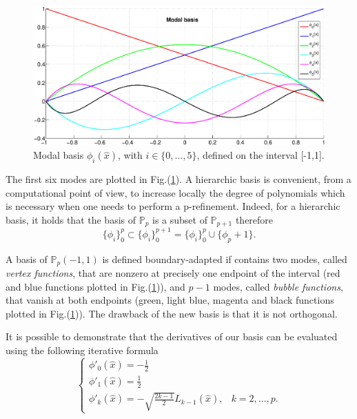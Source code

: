 \begin{figure}
\centering
\includegraphics[scale=0.3]{images/1D_basis.eps}
\caption{Modal basis $\phi_i(\hat{x})$, with $i\in\{0,\dots,5\}$, defined on the interval [-1,1].}\label{fig:1D_basis}
\end{figure}

The first six modes are plotted in Fig.(\ref{fig:1D_basis}). A hierarchic basis is convenient, from a computational point of view, to increase locally the degree of polynomials which is necessary when one needs to perform a p-refinement. Indeed, for a hierarchic basis, it holds that the basis of $\mathbb{P}_p$ is a subset of $\mathbb{P}_{p+1}$ therefore
\begin{equation}
  \{\phi_i\}_0^p\subset\{\phi_i\}_0^{p+1}=\{\phi_i\}_0^p\cup\{\phi_p+1\}.
\end{equation}

A basis of $\mathbb{P}_p(-1,1)$ is defined boundary-adapted if contains two modes, called \textit{vertex functions}, that are nonzero at precisely one endpoint of the interval (red and blue functions plotted in Fig.(\ref{fig:1D_basis})), and $p-1$ modes, called \textit{bubble functions}, that vanish at both endpoints (green, light blue, magenta and black functions plotted in Fig.(\ref{fig:1D_basis})). The drawback of the new basis is that it is not orthogonal.
\medskip

It is possible to demonstrate that the derivatives of our basis can be evaluated using the following iterative formula
\begin{equation}
  \begin{cases}
    \phi'_0(\hat{x})=-\frac{1}{2}\\
    \phi'_1(\hat{x})=\frac{1}{2}\\
    \phi'_k(\hat{x})=-\sqrt{\frac{2k-1}{2}}L_{k-1}(\hat{x}), & k=2,\dots,p.
  \end{cases}
\end{equation}
\medskip

